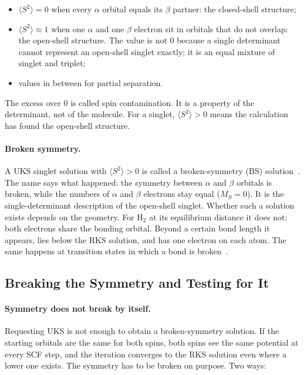 \begin{itemize}
  \item $\langle S^2 \rangle = 0$ when every $\alpha$ orbital equals its
    $\beta$ partner: the closed-shell structure;
  \item $\langle S^2 \rangle \approx 1$ when one $\alpha$ and one $\beta$
    electron sit in orbitals that do not overlap: the open-shell structure.
    The value is not 0 because a single determinant cannot represent an
    open-shell singlet exactly; it is an equal mixture of singlet and
    triplet;
  \item values in between for partial separation.
\end{itemize}

The excess over 0 is called spin contamination. It is a property of the
determinant, not of the molecule. For a singlet, $\langle S^2 \rangle > 0$
means the calculation has found the open-shell structure.

\paragraph{Broken symmetry.} A UKS singlet solution with
$\langle S^2 \rangle > 0$ is called a broken-symmetry (BS)
solution~\cite{noodleman1981}. The name says what happened: the symmetry
between $\alpha$ and $\beta$ orbitals is broken, while the numbers of
$\alpha$ and $\beta$ electrons stay equal ($M_S = 0$). It is the
single-determinant description of the open-shell singlet.
Whether such a solution exists depends on the geometry. For H$_2$ at its
equilibrium distance it does not; both electrons share the bonding
orbital. Beyond a certain bond length it appears, lies below the RKS
solution, and has one electron on each atom. The same happens at
transition states in which a bond is broken~\cite{bursch2022}.

\subsection{Breaking the Symmetry and Testing for It}
\label{sec:background-stability}

\paragraph{Symmetry does not break by itself.} Requesting UKS is not
enough to obtain a broken-symmetry solution. If the starting orbitals are
the same for both spins, both spins see the same potential at every SCF
step, and the iteration converges to the RKS solution even where a lower
one exists. The symmetry has to be broken on purpose. Two ways:

